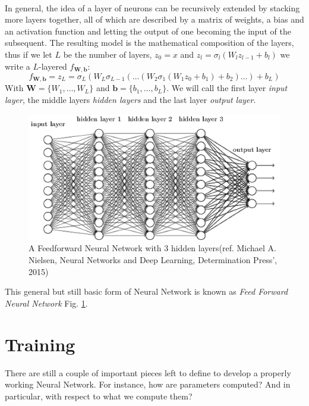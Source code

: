 \documentclass[LaM,binding=0.6cm]{./packages/sapthesis/sapthesis}
\begin{document}
            \paragraph{}
            In general, the idea of a layer of neurons can be recursively extended by stacking more layers together, all of which are described by a matrix of weights, a bias and an activation function
            and letting the output of one becoming the input of the subsequent.
            The resulting model is the mathematical composition of the layers, thus if we let $ L $ be the number of layers, $ z_0 = x $ and $ z_l = \sigma_l\left(W_{l}z_{l-1} + b_l\right)$
            we write a $L$-layered $f_{\mathbf{W}, \mathbf{b}}$:
            \[
                f_{\mathbf{W}, \mathbf{b}} = z_L = \sigma_{L}\left(W_{L}\sigma_{L-1}\left(\ldots\left(W_2\sigma_{1}\left(W_{1}z_{0} +b_1\right)+ b_2\right)\ldots\right)+ b_{L}\right)
            \]
            With $ \mathbf{W} = \{W_1, \ldots, W_{L}\} $ and $ \mathbf{b}= \{b_1, \ldots, b_{L}\} $. We will call the first layer \textit{input layer}, the middle layers \textit{hidden layers}
            and the last layer \textit{output layer}.
            \begin{figure}[h]
                \centering
                \includegraphics[scale=0.5]{fnn}
                \caption{A Feedforward Neural Network with 3 hidden layers(ref. Michael A. Nielsen, Neural Networks and Deep Learning, Determination Press', 2015)}
                \label{fig:fnn}
            \end{figure}
            This general but still basic form of Neural Network is known as \textit{Feed Forward Neural Network} Fig. \ref{fig:fnn}. 
        \section{Training}

            There are still a couple of important pieces left to define to develop a properly working Neural Network. For instance, how are parameters computed? And in particular, with respect to what we compute them? 
\end{document}
